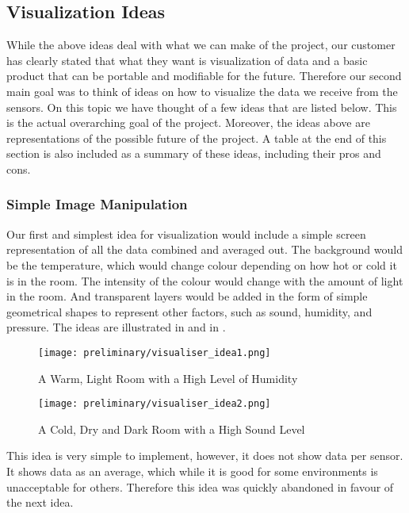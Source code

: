 \documentclass[../document]{subfiles}
\begin{document}
\subsection{Visualization Ideas}
While the above ideas deal with what we can make of the project, our customer has clearly stated that what they want is visualization of data and a basic product that can be portable and modifiable for the future. Therefore our second main goal was to think of ideas on how to visualize the data we receive from the sensors. On this topic we have thought of a few ideas that are listed below. This is the actual overarching goal of the project. Moreover, the ideas above are representations of the possible future of the project. A table at the end of this section is also included as a summary of these ideas, including their pros and cons.

\subsubsection{Simple Image Manipulation}
Our first and simplest idea for visualization would include a simple screen representation of all the data combined and averaged out. The background would be the temperature, which would change colour depending on how hot or cold it is in the room. The intensity of the colour would change with the amount of light in the room. And transparent layers would be added in the form of simple geometrical shapes to represent other factors, such as sound, humidity, and pressure. The ideas are illustrated in   and in .

\begin{figure}[H]
	\texttt{[image: preliminary/visualiser\_idea1.png]}
	\caption{A Warm, Light Room with a High Level of Humidity}
	\label{fig:visualiser_idea1}
\end{figure}

\begin{figure}[H]
	\texttt{[image: preliminary/visualiser\_idea2.png]}
	\caption{A Cold, Dry and Dark Room with a High Sound Level}
	\label{fig:visualiser_idea2}
\end{figure}

This idea is very simple to implement, however, it does not show data per sensor. It shows data as an average, which while it is good for some environments is unacceptable for others. Therefore this idea was quickly abandoned in favour of the next idea.
\end{document}
